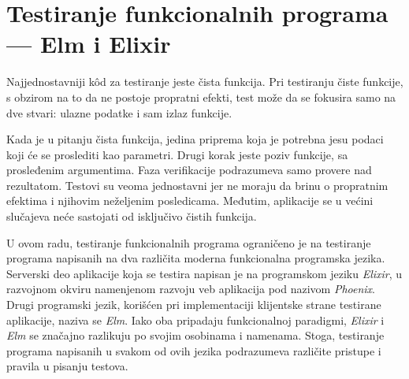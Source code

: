 \documentclass[12pt,oneside]{memoir}
\begin{document}
\section{Testiranje funkcionalnih programa --- Elm i Elixir}
\label{sec:elmopste}

\par Najjednostavniji k\^{o}d za testiranje jeste čista funkcija. Pri testiranju čiste funkcije, s obzirom na to da ne postoje propratni efekti, test može da se fokusira samo na dve stvari: ulazne podatke i sam izlaz funkcije. 
\par Kada je u pitanju čista funkcija, jedina priprema koja je potrebna jesu podaci koji će se proslediti kao parametri. Drugi korak jeste poziv funkcije, sa prosleđenim argumentima. Faza verifikacije podrazumeva samo provere nad rezultatom. Testovi su veoma jednostavni jer ne moraju da brinu o propratnim efektima i njihovim neželjenim posledicama. Međutim, aplikacije se u većini slučajeva neće sastojati od isključivo čistih funkcija.
\par U ovom radu, testiranje funkcionalnih programa ograničeno je na testiranje programa napisanih na dva različita moderna funkcionalna programska jezika. Serverski deo aplikacije koja se testira napisan je na programskom jeziku \emph{Elixir}, u razvojnom okviru namenjenom razvoju veb aplikacija pod nazivom \emph{Phoenix}. Drugi programski jezik, korišćen pri implementaciji klijentske strane testirane aplikacije, naziva se \emph{Elm}. Iako oba pripadaju funkcionalnoj paradigmi, \emph{Elixir} i \emph{Elm} se značajno razlikuju po svojim osobinama i namenama. Stoga, testiranje programa napisanih u svakom od ovih jezika podrazumeva različite pristupe i pravila u pisanju testova.   
\end{document}

